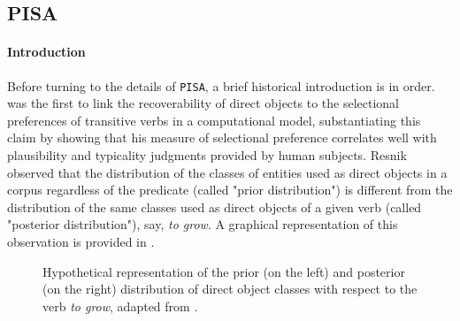 \subsection{PISA}

\paragraph{Introduction} Before turning to the details of \texttt{PISA}, a brief historical introduction is in order. \textcite{Resnik1993, Resnik1996} was the first to link the recoverability of direct objects to the selectional preferences of transitive verbs in a computational model, substantiating this claim by showing that his measure of selectional preference correlates well with plausibility and typicality judgments provided by human subjects. Resnik observed that the distribution of the classes of entities used as direct objects in a corpus regardless of the predicate (called "prior distribution") is different from the distribution of the same classes used as direct objects of a given verb (called "posterior distribution"), say, \textit{to grow}. A graphical representation of this observation is provided in .

\begin{center}
\begin{figure}[htb]
\caption{Hypothetical representation of the prior (on the left) and posterior (on the right) distribution of direct object classes with respect to the verb \textit{to grow}, adapted from \textcite[54]{Resnik1993}.}
\hspace{1cm}
\end{figure}
\end{center}

